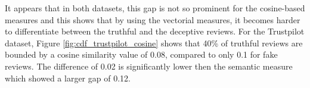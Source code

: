 It appears that in both datasets, this gap is not so prominent for the cosine-based measures and this shows that by using the vectorial measures, it becomes harder to differentiate between the truthful and the deceptive reviews. For the Trustpilot dataset, Figure \ref{fig:cdf_trustpilot_cosine} shows that 40\% of truthful reviews are bounded by a cosine similarity value of 0.08, compared to only 0.1 for fake reviews. The difference of 0.02 is significantly lower then the semantic measure which showed a larger gap of 0.12. 

\begin{figure}[ht]
\begin{center}
\qquad
{}
\end{center}
\end{figure}
